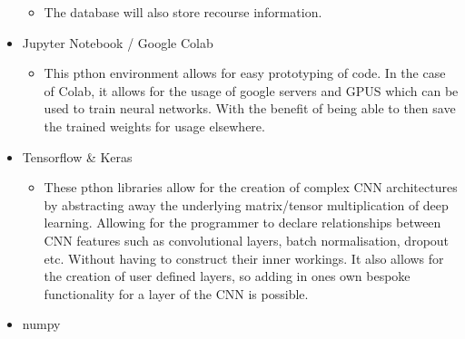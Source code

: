 \begin{itemize}
\begin{itemize}
      \item The database will also store recourse information.
    \end{itemize}
    \item Jupyter Notebook / Google Colab
      \begin{itemize}
        \item This pthon environment allows for easy prototyping of code. In the case of Colab, it allows for the usage of google servers and GPUS which can be used to train neural networks. With the benefit of being able to then save the trained weights for usage elsewhere.
      \end{itemize}
    \item Tensorflow \& Keras
      \begin{itemize}
        \item These pthon libraries allow for the creation of complex CNN architectures by abstracting away the underlying matrix/tensor multiplication of deep learning. Allowing for the programmer to declare relationships between CNN features such as convolutional layers, batch normalisation, dropout etc. Without having to construct their inner workings. It also allows for the creation of user defined layers, so adding in ones own bespoke functionality for a layer of the CNN is possible.
      \end{itemize}
    \item numpy
  \end{itemize}
